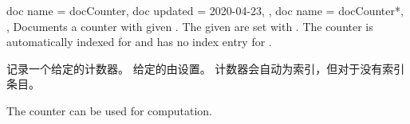 % 
% 
% 
% 
% 
% 





\begin{docCommands}[doc parameter=\oarg{options}\marg{name}]
{
  {
    doc name    = docCounter,
    doc updated = 2020-04-23,
  },
  {
    doc name = docCounter*,
  },
}
Documents a counter with given .
The given  are set with .
The counter is automatically indexed for 
and has no index entry for .

记录一个给定的计数器。 给定的由设置。 计数器会自动为索引，但对于没有索引条目。
\begin{dispExample}
The counter  can be used for computation.
\end{dispExample}
\end{docCommands}







